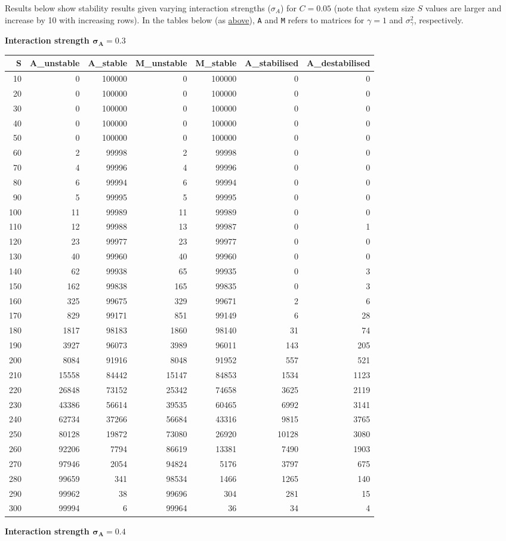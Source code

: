 \documentclass[]{article}
\begin{document}
Results below show stability results given varying interaction strengths
(\(\sigma_{A}\)) for \(C = 0.05\) (note that system size \(S\) values
are larger and increase by 10 with increasing rows). In the tables below
(as \protect\hyperlink{IncrS}{above}), \texttt{A} and \texttt{M} refers
to matrices for \(\gamma = 1\) and \(\sigma^{2}_{\gamma}\),
respectively.

\textbf{Interaction strength \(\mathbf{\sigma_{A} = 0.3}\)}

\begin{longtable}[]{@{}rrrrrrr@{}}
\toprule
S & A\_unstable & A\_stable & M\_unstable & M\_stable & A\_stabilised &
A\_destabilised\tabularnewline
\midrule
\endhead
10 & 0 & 100000 & 0 & 100000 & 0 & 0\tabularnewline
20 & 0 & 100000 & 0 & 100000 & 0 & 0\tabularnewline
30 & 0 & 100000 & 0 & 100000 & 0 & 0\tabularnewline
40 & 0 & 100000 & 0 & 100000 & 0 & 0\tabularnewline
50 & 0 & 100000 & 0 & 100000 & 0 & 0\tabularnewline
60 & 2 & 99998 & 2 & 99998 & 0 & 0\tabularnewline
70 & 4 & 99996 & 4 & 99996 & 0 & 0\tabularnewline
80 & 6 & 99994 & 6 & 99994 & 0 & 0\tabularnewline
90 & 5 & 99995 & 5 & 99995 & 0 & 0\tabularnewline
100 & 11 & 99989 & 11 & 99989 & 0 & 0\tabularnewline
110 & 12 & 99988 & 13 & 99987 & 0 & 1\tabularnewline
120 & 23 & 99977 & 23 & 99977 & 0 & 0\tabularnewline
130 & 40 & 99960 & 40 & 99960 & 0 & 0\tabularnewline
140 & 62 & 99938 & 65 & 99935 & 0 & 3\tabularnewline
150 & 162 & 99838 & 165 & 99835 & 0 & 3\tabularnewline
160 & 325 & 99675 & 329 & 99671 & 2 & 6\tabularnewline
170 & 829 & 99171 & 851 & 99149 & 6 & 28\tabularnewline
180 & 1817 & 98183 & 1860 & 98140 & 31 & 74\tabularnewline
190 & 3927 & 96073 & 3989 & 96011 & 143 & 205\tabularnewline
200 & 8084 & 91916 & 8048 & 91952 & 557 & 521\tabularnewline
210 & 15558 & 84442 & 15147 & 84853 & 1534 & 1123\tabularnewline
220 & 26848 & 73152 & 25342 & 74658 & 3625 & 2119\tabularnewline
230 & 43386 & 56614 & 39535 & 60465 & 6992 & 3141\tabularnewline
240 & 62734 & 37266 & 56684 & 43316 & 9815 & 3765\tabularnewline
250 & 80128 & 19872 & 73080 & 26920 & 10128 & 3080\tabularnewline
260 & 92206 & 7794 & 86619 & 13381 & 7490 & 1903\tabularnewline
270 & 97946 & 2054 & 94824 & 5176 & 3797 & 675\tabularnewline
280 & 99659 & 341 & 98534 & 1466 & 1265 & 140\tabularnewline
290 & 99962 & 38 & 99696 & 304 & 281 & 15\tabularnewline
300 & 99994 & 6 & 99964 & 36 & 34 & 4\tabularnewline
\bottomrule
\end{longtable}

\textbf{Interaction strength \(\mathbf{\sigma_{A} = 0.4}\)}
\end{document}
